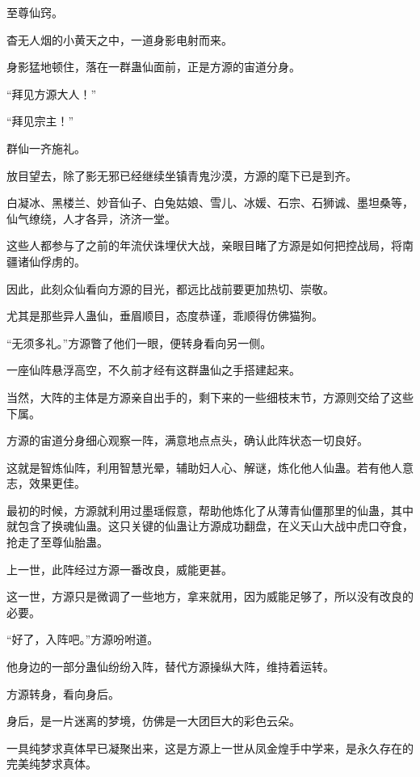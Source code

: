 
\begin{this_body}

至尊仙窍。

杳无人烟的小黄天之中，一道身影电射而来。

身影猛地顿住，落在一群蛊仙面前，正是方源的宙道分身。

“拜见方源大人！”

“拜见宗主！”

群仙一齐施礼。

放目望去，除了影无邪已经继续坐镇青鬼沙漠，方源的麾下已是到齐。

白凝冰、黑楼兰、妙音仙子、白兔姑娘、雪儿、冰媛、石宗、石狮诚、墨坦桑等，仙气缭绕，人才各异，济济一堂。

这些人都参与了之前的年流伏诛埋伏大战，亲眼目睹了方源是如何把控战局，将南疆诸仙俘虏的。

因此，此刻众仙看向方源的目光，都远比战前要更加热切、崇敬。

尤其是那些异人蛊仙，垂眉顺目，态度恭谨，乖顺得仿佛猫狗。

“无须多礼。”方源瞥了他们一眼，便转身看向另一侧。

一座仙阵悬浮高空，不久前才经有这群蛊仙之手搭建起来。

当然，大阵的主体是方源亲自出手的，剩下来的一些细枝末节，方源则交给了这些下属。

方源的宙道分身细心观察一阵，满意地点点头，确认此阵状态一切良好。

这就是智炼仙阵，利用智慧光晕，辅助妇人心、解谜，炼化他人仙蛊。若有他人意志，效果更佳。

最初的时候，方源就利用过墨瑶假意，帮助他炼化了从薄青仙僵那里的仙蛊，其中就包含了换魂仙蛊。这只关键的仙蛊让方源成功翻盘，在义天山大战中虎口夺食，抢走了至尊仙胎蛊。

上一世，此阵经过方源一番改良，威能更甚。

这一世，方源只是微调了一些地方，拿来就用，因为威能足够了，所以没有改良的必要。

“好了，入阵吧。”方源吩咐道。

他身边的一部分蛊仙纷纷入阵，替代方源操纵大阵，维持着运转。

方源转身，看向身后。

身后，是一片迷离的梦境，仿佛是一大团巨大的彩色云朵。

一具纯梦求真体早已凝聚出来，这是方源上一世从凤金煌手中学来，是永久存在的完美纯梦求真体。


\end{this_body}
